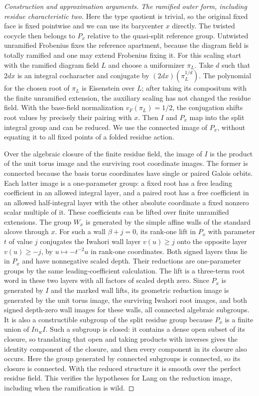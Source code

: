 \documentclass[11pt,a4paper,openany,oneside]{book}
\theoremstyle{resultstyle}
\theoremstyle{definition}
\numberwithin{equation}{chapter}
\begin{document}
\begin{proof}[Construction and approximation arguments]
\medskip\noindent
\textit{The ramified outer form, including residue characteristic two.}
Here the type quotient is trivial, so the original fixed face
is fixed pointwise and we can use its barycenter \(x\) directly.
The twisted cocycle then belongs to \(P_x\) relative to the
quasi-split reference group. Untwisted unramified Frobenius
fixes the reference apartment, because the diagram field is
totally ramified and one may extend Frobenius fixing it.
For this scaling start with the ramified diagram field \(L\)
and choose a uniformizer \(\pi_L\). Take \(d\) such that \(2d x\)
is an integral cocharacter and conjugate by
\((2d x)(\pi_L^{1/d})\). The polynomial for the chosen
root of \(\pi_L\) is Eisenstein over \(L\); after taking its
compositum with the finite unramified extension, the auxiliary
scaling has not changed the residue field. With the base-field
normalization \(v_F(\pi_L)=1/2\), the conjugation shifts root
values by precisely their pairing with \(x\). Then \(I\) and \(P_x\) map into the
split integral group and can be reduced. We use the connected
image of \(P_x\), without equating it to all fixed points of
a folded residue action.

Over the algebraic closure of the finite residue field, the
image of \(I\) is the product of the unit torus image and the
surviving root coordinate images. The former is connected
because the basis torus coordinates have single or paired
Galois orbits. Each latter image is a one-parameter group:
a fixed root has a free leading coefficient in an allowed
integral layer, and a paired root has a free coefficient
in an allowed half-integral layer with the other absolute
coordinate a fixed nonzero scalar multiple of it. These
coefficients can be lifted over finite unramified extensions.
The group \(W_x\) is generated by the simple affine walls of the standard alcove through \(x\).
For such a wall \(\beta+j=0\), its rank-one lift in \(P_x\) with parameter \(t\) of value \(j\) conjugates the Iwahori wall layer \(v(u)\ge j\) onto the opposite layer \(v(u)\ge -j\), by \(u\mapsto -t^{-2}u\) in rank-one coordinates.
Both signed layers thus lie in \(P_x\) and have nonnegative scaled depth. Their reductions are one-parameter groups by the same leading-coefficient calculation.
The lift is a three-term root word in these two layers with all factors of scaled depth zero.
Since \(P_x\) is generated by \(I\) and the marked wall lifts, its geometric reduction image is generated by the unit torus image, the surviving Iwahori root images,
and both signed depth-zero wall images for these walls, all connected algebraic subgroups.
It is also a constructible subgroup of the split residue
group because \(P_x\) is a finite union of \(I n_w I\).
Such a subgroup is closed: it contains a dense open subset
of its closure, so translating that open and taking products
with inverses gives the identity component of the closure,
and then every component in its closure also occurs.
Here the group generated by connected subgroups is connected,
so its closure is connected. With the reduced structure it
is smooth over the perfect residue field. This verifies
the hypotheses for Lang on the reduction image, including
when the ramification is wild.


\end{proof}
\end{document}
